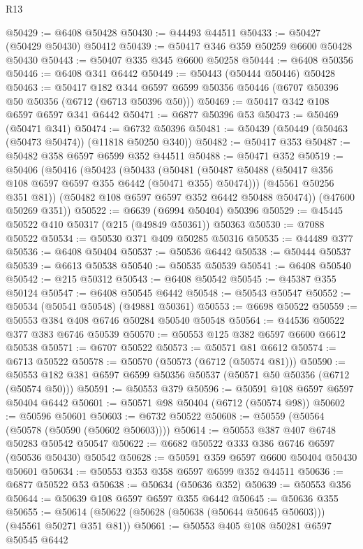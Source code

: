 \begin{lexlean}{R13}
\begin{coremodule}
@50429 := @6408 @50428
@50430 := @44493 @44511
@50433 := @50427 (@50429 @50430) @50412
@50439 := @50417 @346 @359 @50259 @6600 @50428 @50430
@50443 := @50407 @335 @345 @6600 @50258
@50444 := @6408 @50356
@50446 := @6408 @341 @6442
@50449 := @50443 (@50444 @50446) @50428
@50463 := @50417
    @182
    @344
    @6597
    @6599
    @50356
    @50446
    (@6707 @50396 @50 @50356 (@6712 (@6713 @50396 @50)))
@50469 := @50417 @342 @108 @6597 @6597 @341 @6442
@50471 := @6877 @50396 @53
@50473 := @50469 (@50471 @341)
@50474 := @6732 @50396
@50481 := @50439 (@50449 (@50463 (@50473 @50474)) (@11818 @50250 @340))
@50482 := @50417 @353
@50487 := @50482 @358 @6597 @6599 @352 @44511
@50488 := @50471 @352
@50519 := @50406
    (@50416
      (@50423
        (@50433
          (@50481 (@50487 @50488 (@50417 @356 @108 @6597 @6597 @355 @6442 (@50471 @355) @50474)))
          (@45561 @50256 @351 @81))
        (@50482 @108 @6597 @6597 @352 @6442 @50488 @50474))
      (@47600 @50269 @351))
@50522 := @6639 (@6994 @50404) @50396
@50529 := @45445 @50522 @410 @50317 (@215 (@49849 @50361)) @50363
@50530 := @7088 @50522
@50534 := @50530 @371 @409 @50285 @50316
@50535 := @44489 @377
@50536 := @6408 @50404
@50537 := @50536 @6442
@50538 := @50444 @50537
@50539 := @6613 @50538
@50540 := @50535 @50539
@50541 := @6408 @50540
@50542 := @215 @50312
@50543 := @6408 @50542
@50545 := @45387 @355 @50124
@50547 := @6408 @50545 @6442
@50548 := @50543 @50547
@50552 := @50534 (@50541 @50548) (@49881 @50361)
@50553 := @6698 @50522
@50559 := @50553 @384 @408 @6746 @50284 @50540 @50548
@50564 := @44536 @50522 @377 @383 @6746 @50539
@50570 := @50553 @125 @382 @6597 @6600 @6612 @50538
@50571 := @6707 @50522
@50573 := @50571 @81 @6612
@50574 := @6713 @50522
@50578 := @50570 (@50573 (@6712 (@50574 @81)))
@50590 := @50553 @182 @381 @6597 @6599 @50356 @50537 (@50571 @50 @50356 (@6712 (@50574 @50)))
@50591 := @50553 @379
@50596 := @50591 @108 @6597 @6597 @50404 @6442
@50601 := @50571 @98 @50404 (@6712 (@50574 @98))
@50602 := @50596 @50601
@50603 := @6732 @50522
@50608 := @50559 (@50564 (@50578 (@50590 (@50602 @50603))))
@50614 := @50553 @387 @407 @6748 @50283 @50542 @50547
@50622 := @6682 @50522 @333 @386 @6746 @6597 (@50536 @50430) @50542
@50628 := @50591 @359 @6597 @6600 @50404 @50430 @50601
@50634 := @50553 @353 @358 @6597 @6599 @352 @44511
@50636 := @6877 @50522 @53
@50638 := @50634 (@50636 @352)
@50639 := @50553 @356
@50644 := @50639 @108 @6597 @6597 @355 @6442
@50645 := @50636 @355
@50655 := @50614 (@50622 (@50628 (@50638 (@50644 @50645 @50603))) (@45561 @50271 @351 @81))
@50661 := @50553 @405 @108 @50281 @6597 @50545 @6442

\end{coremodule}
\end{lexlean}
